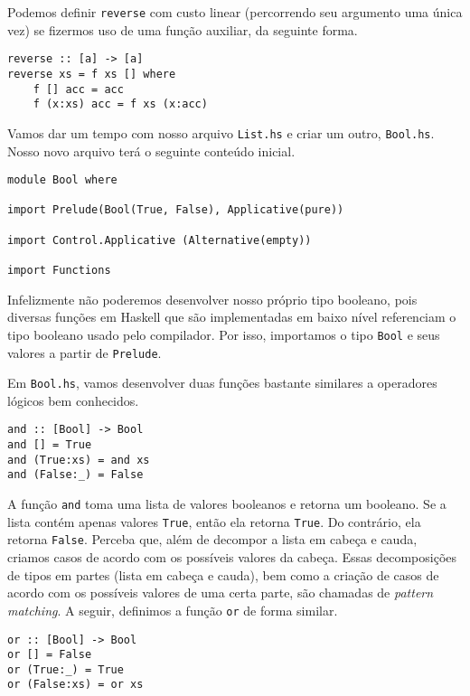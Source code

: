 \documentclass[a4paper]{article}
\begin{document}
Podemos definir \texttt{reverse} com custo linear (percorrendo seu argumento uma única vez) se fizermos uso de uma função auxiliar, da seguinte forma.

\begin{verbatim}
reverse :: [a] -> [a]
reverse xs = f xs [] where
	f [] acc = acc
	f (x:xs) acc = f xs (x:acc)
\end{verbatim}

Vamos dar um tempo com nosso arquivo \texttt{List.hs} e criar um outro, \texttt{Bool.hs}.
Nosso novo arquivo terá o seguinte conteúdo inicial.

\begin{verbatim}
module Bool where

import Prelude(Bool(True, False), Applicative(pure))

import Control.Applicative (Alternative(empty))

import Functions
\end{verbatim}

Infelizmente não poderemos desenvolver nosso próprio tipo booleano, pois diversas funções em Haskell que são implementadas em baixo nível referenciam o tipo booleano usado pelo compilador.
Por isso, importamos o tipo \texttt{Bool} e seus valores a partir de \texttt{Prelude}.

Em \texttt{Bool.hs}, vamos desenvolver duas funções bastante similares a operadores lógicos bem conhecidos.

\begin{verbatim}
and :: [Bool] -> Bool
and [] = True
and (True:xs) = and xs
and (False:_) = False
\end{verbatim}

A função \texttt{and} toma uma lista de valores booleanos e retorna um booleano.
Se a lista contém apenas valores \texttt{True}, então ela retorna \texttt{True}.
Do contrário, ela retorna \texttt{False}.
Perceba que, além de decompor a lista em cabeça e cauda, criamos casos de acordo com os possíveis valores da cabeça.
Essas decomposições de tipos em partes (lista em cabeça e cauda), bem como a criação de casos de acordo com os possíveis valores de uma certa parte, são chamadas de \emph{pattern matching}.
A seguir, definimos a função \texttt{or} de forma similar.

\begin{verbatim}
or :: [Bool] -> Bool
or [] = False
or (True:_) = True
or (False:xs) = or xs
\end{verbatim}
\end{document}
